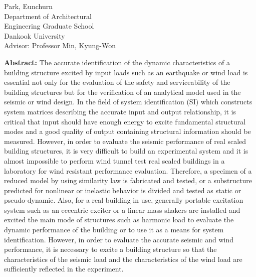 \begin{center}
\end{center}
\begin{flushright}
Park, Eunchurn\\
Department of Architectural\\
Engineering Graduate School\\
Dankook University\\
\vspace{0.3cm}
Advisor: Professor Min, Kyung-Won
\end{flushright}
{\large\textbf{Abstract:}}
The accurate identification of the dynamic characteristics of a building structure excited by input loads such as an earthquake or wind load is essential not only for the evaluation of the safety and serviceability of the building structures but for the verification of an analytical model used in the seismic or wind design. In the field of system identification (SI) which constructs system matrices describing the accurate input and output relationship, it is critical that input should have enough energy to excite fundamental structural modes and a good quality of output containing structural information should be measured. However, in order to evaluate the seismic performance of real scaled building structures, it is very difficult to build an experimental system and it is almost impossible to perform wind tunnel test real scaled buildings in a laboratory for wind resistant performance evaluation. Therefore, a specimen of a reduced model by using similarity law is fabricated and tested, or a substructure predicted for nonlinear or inelastic behavior is divided and tested as static or pseudo-dynamic. Also, for a real building in use, generally portable excitation system such as an eccentric exciter or a linear mass shakers are installed and excited the main mode of structures such as harmonic load to evaluate the dynamic performance of the building or to use it as a means for system identification. However, in order to evaluate the accurate seismic and wind performance, it is necessary to excite a building structure so that the characteristics of the seismic load and the characteristics of the wind load are sufficiently reflected in the experiment.

